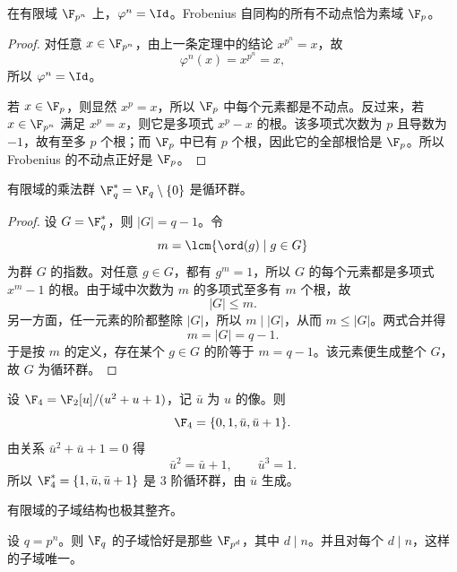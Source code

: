 \begin{corollary}
在有限域 $\F_{p^n}$ 上，$\varphi^n=\Id$。Frobenius 自同构的所有不动点恰为素域 $\F_p$。
\end{corollary}

\begin{proof}
对任意 $x\in\F_{p^n}$，由上一条定理中的结论 $x^{p^n}=x$，故
\[
\varphi^n(x)=x^{p^n}=x,
\]
所以 $\varphi^n=\Id$。

若 $x\in\F_p$，则显然 $x^p=x$，所以 $\F_p$ 中每个元素都是不动点。反过来，若 $x\in\F_{p^n}$ 满足 $x^p=x$，则它是多项式 $x^p-x$ 的根。该多项式次数为 $p$ 且导数为 $-1$，故有至多 $p$ 个根；而 $\F_p$ 中已有 $p$ 个根，因此它的全部根恰是 $\F_p$。所以 Frobenius 的不动点正好是 $\F_p$。
\end{proof}

\begin{theorem}
有限域的乘法群 $\F_q^*=\F_q\setminus\{0\}$ 是循环群。
\end{theorem}

\begin{proof}
设 $G=\F_q^*$，则 $|G|=q-1$。令
\[
m=\lcm\{\ord(g)\mid g\in G\}
\]
为群 $G$ 的指数。对任意 $g\in G$，都有 $g^m=1$，所以 $G$ 的每个元素都是多项式 $x^m-1$ 的根。由于域中次数为 $m$ 的多项式至多有 $m$ 个根，故
\[
|G|\le m.
\]
另一方面，任一元素的阶都整除 $|G|$，所以 $m\mid |G|$，从而 $m\le |G|$。两式合并得
\[
m=|G|=q-1.
\]
于是按 $m$ 的定义，存在某个 $g\in G$ 的阶等于 $m=q-1$。该元素便生成整个 $G$，故 $G$ 为循环群。
\end{proof}

\begin{example}
设 $\F_4=\F_2[u]/(u^2+u+1)$，记 $\bar u$ 为 $u$ 的像。则
\[
\F_4=\{0,1,\bar u,\bar u+1\}.
\]
由关系 $\bar u^2+\bar u+1=0$ 得
\[
\bar u^2=\bar u+1,
\qquad \bar u^3=1.
\]
所以 $\F_4^*=\{1,\bar u,\bar u+1\}$ 是 3 阶循环群，由 $\bar u$ 生成。
\end{example}

有限域的子域结构也极其整齐。

\begin{theorem}[有限域的子域分类]
设 $q=p^n$。则 $\F_q$ 的子域恰好是那些 $\F_{p^d}$，其中 $d\mid n$。并且对每个 $d\mid n$，这样的子域唯一。
\end{theorem}

